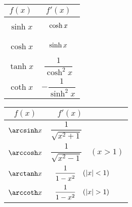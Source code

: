 \documentclass[a4paper, 12pt]{scrartcl}
\begin{document}
\begin{blueBox}
\begin{minipage}{0.35\textwidth}
\begin{center}
    \end{center}
  \end{minipage}%
  \begin{minipage}{0.25\textwidth}
    \def\arraystretch{1.5}
    \begin{tabular}{c | c}
      $f(x)$    & $f'(x)$                                      \\ \toprule
      $\sinh x$ & $\cosh x \vphantom{\dfrac{1}{\sqrt{x^2-1}}}$ \\ [2mm]
      $\cosh x$ & $\sinh x \vphantom{\dfrac{1}{\sqrt{x^2-1}}}$ \\ [2mm]
      $\tanh x$ & $\dfrac{1}{\cosh^2 x}$                       \\ [2mm]
      $\coth x$ & $-\dfrac{1}{\sinh^2 x}$                      \\ \bottomrule
    \end{tabular}
  \end{minipage}%
  \begin{minipage}{0.4\textwidth}
    \def\arraystretch{1.5}
    \begin{tabular}{c | l}
      $f(x)$       & $\;\;\;f'(x)$                                             \\ \toprule
      $\arcsinh x$ & $\dfrac{1}{\sqrt{x^2+1}}$                                 \\ [2mm]
      $\arccosh x$ & $\dfrac{1}{\sqrt{x^2-1}} \;\;\;\, (x > 1)$                \\ [2mm]
      $\arctanh x$ & $\;\;\dfrac{1}{1-x^2 \vphantom{\cosh^2}} \quad (|x| < 1)$ \\ [2mm]
      $\arccoth x$ & $\;\;\dfrac{1}{1-x^2 \vphantom{\sinh^2}} \quad (|x| > 1)$ \\ \bottomrule
    \end{tabular}
  \end{minipage}
\end{blueBox}
\end{document}
